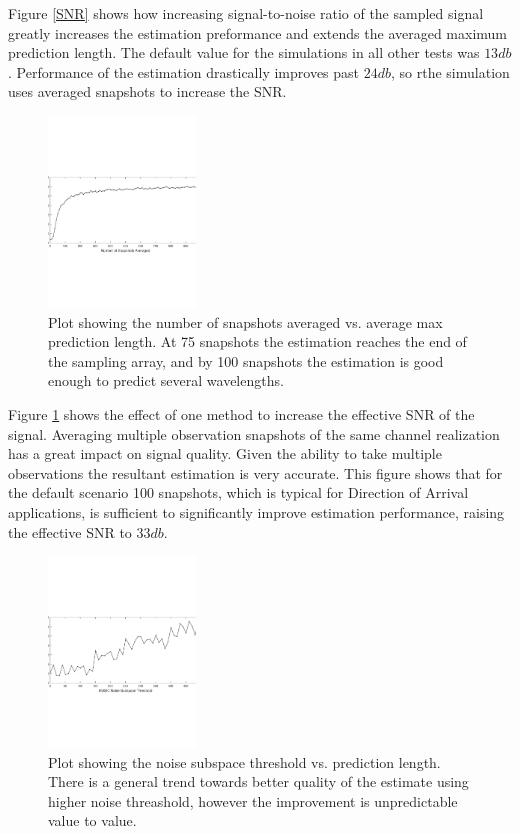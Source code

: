 \documentclass{allertonproc}
\begin{document}
Figure \ref{SNR} shows how increasing signal-to-noise ratio of the sampled signal greatly increases the estimation preformance and extends the averaged maximum prediction length. The default value for the simulations in all other tests was $13db$. Performance of the estimation drastically improves past $24db$, so rthe simulation uses averaged snapshots to increase the SNR.

\begin{figure}[ht!]
\begin{center}
\includegraphics[height=2in]{numSnapshots}
\caption{Plot showing the number of snapshots averaged vs. average max prediction length. At 75 snapshots the estimation reaches the end of the sampling array, and by 100 snapshots the estimation is good enough to predict several wavelengths.}\label{snapshot}
\end{center}
\end{figure}

Figure \ref{snapshot} shows the effect of one method to increase the effective SNR of the signal. Averaging multiple observation snapshots of the same channel realization has a great impact on signal quality. Given the ability to take multiple observations the resultant estimation is very accurate. This figure shows that for the default scenario 100 snapshots, which is typical for Direction of Arrival applications, is sufficient to significantly improve estimation performance, raising the effective SNR to $33db$. 

\begin{figure}[ht!]
\begin{center}
\includegraphics[height=2in]{musicNoise}
\caption{Plot showing the noise subspace threshold vs. prediction length. There is a general trend towards better quality of the estimate using higher noise threashold, however the improvement is unpredictable value to value.}\label{thresh}
\end{center}
\end{figure}
\end{document}
